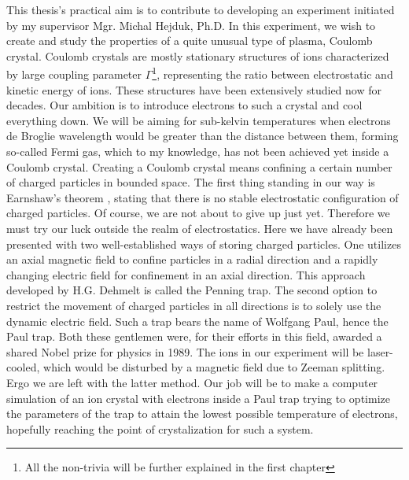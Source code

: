 
This thesis's practical aim is to contribute to developing an experiment initiated by my supervisor Mgr. Michal Hejduk, Ph.D. In this experiment, we wish to create and study the properties of a quite unusual type of plasma, Coulomb crystal. Coulomb crystals are mostly stationary structures of ions characterized by large coupling parameter $\Gamma$\footnote{All the non-trivia will be further explained in the first chapter}, representing the ratio between electrostatic and kinetic energy of ions. These structures have been extensively studied now for decades. Our ambition is to introduce electrons to such a crystal and cool everything down. We will be aiming for sub-kelvin temperatures when electrons de Broglie wavelength would be greater than the distance between them, forming so-called Fermi gas, which to my knowledge, has not been achieved yet inside a Coulomb crystal. Creating a Coulomb crystal means confining a certain number of charged particles in bounded space. The first thing standing in our way is Earnshaw's theorem \cite{earnshaw1848nature}, stating that there is no stable electrostatic configuration of charged particles. Of course, we are not about to give up just yet. Therefore we must try our luck outside the realm of electrostatics. Here we have already been presented with two well-established ways of storing charged particles. One utilizes an axial magnetic field to confine particles in a radial direction and a rapidly changing electric field for confinement in an axial direction. This approach developed by H.G. Dehmelt is called the Penning trap. The second option to restrict the movement of charged particles in all directions is to solely use the dynamic electric field. Such a trap bears the name of Wolfgang Paul, hence the Paul trap. Both these gentlemen were, for their efforts in this field, awarded a shared Nobel prize for physics in 1989. The ions in our experiment will be laser-cooled, which would be disturbed by a magnetic field due to Zeeman splitting. Ergo we are left with the latter method. Our job will be to make a computer simulation of an ion crystal with electrons inside a Paul trap trying to optimize the parameters of the trap to attain the lowest possible temperature of electrons, hopefully reaching the point of crystalization for such a system.
